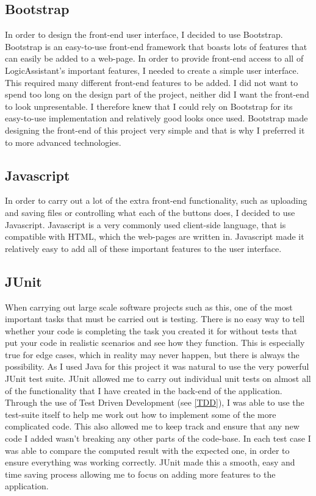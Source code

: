 \subsection{Bootstrap \label{bootstrap}}
In order to design the front-end user interface, I decided to use Bootstrap. Bootstrap is an easy-to-use front-end framework that boasts lots of features that can easily be added to a web-page. In order to provide front-end access to all of LogicAssistant's important features, I needed to create a simple user interface. This required many different front-end features to be added. I did not want to spend too long on the design part of the project, neither did I want the front-end to look unpresentable. I therefore knew that I could rely on Bootstrap for its easy-to-use implementation and relatively good looks once used. Bootstrap made designing the front-end of this project very simple and that is why I preferred it to more advanced technologies.

\subsection{Javascript}

In order to carry out a lot of the extra front-end functionality, such as uploading and saving files or controlling what each of the buttons does, I decided to use Javascript. Javascript is a very commonly used client-side language, that is compatible with HTML, which the web-pages are written in. Javascript made it relatively easy to add all of these important features to the user interface. 

\subsection{JUnit\label{JUnit}}

When carrying out large scale software projects such as this, one of the most important tasks that must be carried out is testing. There is no easy way to tell whether your code is completing the task you created it for without tests that put your code in realistic scenarios and see how they function. This is especially true for edge cases, which in reality may never happen, but there is always the possibility. As I used Java for this project it was natural to use the very powerful JUnit test suite. JUnit allowed me to carry out individual unit tests on almost all of the functionality that I have created in the back-end of the application. Through the use of Test Driven Development (see \ref{TDD}), I was able to use the test-suite itself to help me work out how to implement some of the more complicated code. This also allowed me to keep track and ensure that any new code I added wasn't breaking any other parts of the code-base. In each test case I was able to compare the computed result with the expected one, in order to ensure everything was working correctly. JUnit made this a smooth, easy and time saving process allowing me to focus on adding more features to the application.

